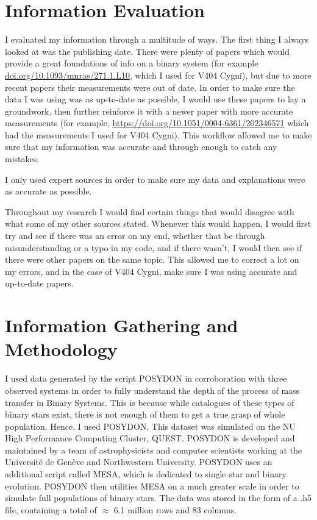 \documentclass[12pt, a4paper]{article}
\begin{document}
\section{Information Evaluation}
    I evaluated my information through a multitude of ways. The first thing I always looked at was the publishing date. There were plenty of papers which would provide a great foundations of info on a binary system (for example \url{doi.org/10.1093/mnras/271.1.L10}, which I used for V404 Cygni), but due to more recent papers their measurements were out of date. In order to make sure the data I was using was as up-to-date as possible, I would use these papers to lay a groundwork, then further reinforce it with a newer paper with more accurate measurements (for example, \url{https://doi.org/10.1051/0004-6361/202346571} which had the measurements I used for V404 Cygni). This workflow allowed me to make sure that my information was accurate and through enough to catch any mistakes.

    I only used expert sources in order to make sure my data and explanations were as accurate as possible.

    Throughout my research I would find certain things that would disagree with what some of my other sources stated. Whenever this would happen, I would first try and see if there was an error on my end, whether that be through misunderstanding or a typo in my code, and if there wasn't, I would then see if there were other papers on the same topic. This allowed me to correct a lot on my errors, and in the case of V404 Cygni, make sure I was using accurate and up-to-date papers. 

\section{Information Gathering and Methodology}

    I used data generated by the script POSYDON in corroboration with three observed systems in order to fully understand the depth of the process of mass transfer in Binary Systems. This is because while catalogues of these types of binary stars exist, there is not enough of them to get a true grasp of whole population. Hence, I used POSYDON. This dataset was simulated on the NU High Performance Computing Cluster, QUEST. POSYDON is developed and maintained by a team of astrophysicists and computer scientists working at the Université de Genève and Northwestern University. POSYDON uses an additional script called MESA, which is dedicated to single star and binary evolution. POSYDON then utilities MESA on a much greater scale in order to simulate full populations of binary stars. The data was stored in the form of a .h5 file, containing a total of $\approx$ 6.1 million rows and 83 columns.
\end{document}
